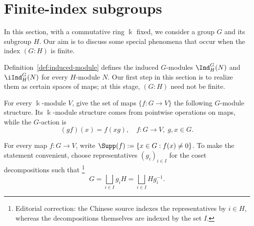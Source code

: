 
\section{Finite-index subgroups}\label{sec:group-finite-index}
\hypertarget{o014.aljabr2.chapter6.finite-index-subgroups}{ }
In this section, with a commutative ring $\Bbbk$ fixed, we consider a group
$G$ and its subgroup $H$. Our aim is to discuss some special phenomena that
occur when the index $(G:H)$ is finite.

Definition~\ref{def:induced-module} defines the induced $G$-modules
$\Ind^G_H(N)$ and $\iInd^G_H(N)$ for every $H$-module $N$. Our first step in
this section is to realize them as certain spaces of maps; at this stage,
$(G:H)$ need not be finite.

For every $\Bbbk$-module $V$, give the set of maps $\{f:G\to V\}$ the
following $G$-module structure. Its $\Bbbk$-module structure comes from
pointwise operations on maps, while the $G$-action is
\[ (g f)(x) = f(xg), \quad f: G \to V, \; g, x \in G. \]

For every map $f:G\to V$, write
$\Supp(f):=\{x\in G:f(x)\neq0\}$. To make the statement convenient, choose
representatives $(g_i)_{i\in I}$ for the coset decompositions such that
\footnote{Editorial correction: the Chinese source indexes the
representatives by $i\in H$, whereas the decompositions themselves are
indexed by the set $I$.}
\[ G = \bigsqcup_{i \in I} g_i H = \bigsqcup_{i \in I} Hg_i^{-1}. \]

